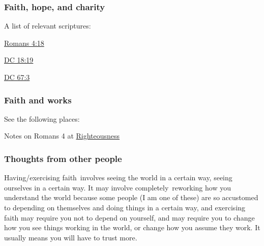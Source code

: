 	\subsubsection{Faith, hope, and charity}
		\label{FAITH-hope-charity}
		
		A list of relevant scriptures:
		
			\begin{compactitem}
				\item \hyperref[ROMANS-4-18]{Romans 4:18}
				\item \hyperref[DC18-19]{DC 18:19}
				\item \hyperref[DC67-3]{DC 67:3}
			\end{compactitem}
			
	\subsubsection{Faith and works}
		\label{FAITH-works}
		
		See the following places:
		
			\begin{compactitem}
				\item Notes on Romans 4 at \hyperref[RIGHTEOUSNESS]{Righteousness}
			\end{compactitem}
		
	\subsubsection{Thoughts from other people}
		\label{FAITH-others}
		
		\begin{compactdesc}
			\item[27 December 2020, Roger Johnson] Having/exercising faith involves seeing the world in a certain way, seeing ourselves in a certain way. It may involve completely reworking how you understand the world because some people (I am one of these) are so accustomed to depending on themselves and doing things in a certain way, and exercising faith may require you not to depend on yourself, and may require you to change how you see things working in the world, or change how you assume they work. It usually means you will have to trust more.
		\end{compactdesc}